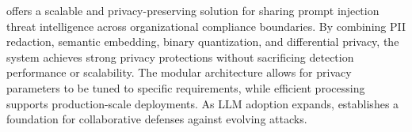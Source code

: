  \tool offers a scalable and privacy-preserving solution for sharing prompt injection threat intelligence across organizational compliance boundaries.
By combining PII redaction, semantic embedding, binary quantization, and differential privacy, the system achieves strong privacy protections without sacrificing detection performance or scalability.
The modular architecture allows for privacy parameters to be tuned to specific requirements, while efficient processing supports production-scale deployments.
As LLM adoption expands, \tool establishes a foundation for collaborative defenses against evolving attacks.



